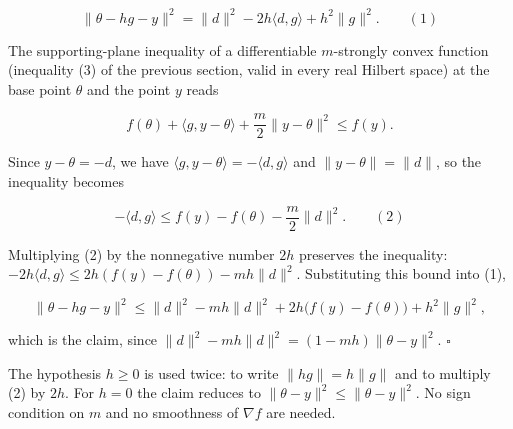 \documentclass[11pt,a4paper]{report}
\begin{document}
\[\|\theta-hg-y\|^2=\|d\|^2-2h\langle d,g\rangle+h^2\|g\|^2.\qquad(1)\]


The supporting-plane inequality of a differentiable \(m\)-strongly convex function (inequality (3) of the previous section, valid in every real Hilbert space) at the base point \(\theta\) and the point \(y\) reads


\[f(\theta)+\langle g,y-\theta\rangle+\frac m2\|y-\theta\|^2\le f(y).\]


Since \(y-\theta=-d\), we have \(\langle g,y-\theta\rangle=-\langle d,g\rangle\) and \(\|y-\theta\|=\|d\|\), so the inequality becomes


\[-\langle d,g\rangle\le f(y)-f(\theta)-\frac m2\|d\|^2.\qquad(2)\]


Multiplying (2) by the nonnegative number \(2h\) preserves the inequality: \(-2h\langle d,g\rangle\le2h(f(y)-f(\theta))-mh\|d\|^2\). Substituting this bound into (1),


\[\|\theta-hg-y\|^2\le\|d\|^2-mh\|d\|^2+2h\bigl(f(y)-f(\theta)\bigr)+h^2\|g\|^2,\]


which is the claim, since \(\|d\|^2-mh\|d\|^2=(1-mh)\|\theta-y\|^2\). \(\square\)




The hypothesis \(h\ge0\) is used twice: to write \(\|hg\|=h\|g\|\) and to multiply (2) by \(2h\). For \(h=0\) the claim reduces to \(\|\theta-y\|^2\le\|\theta-y\|^2\). No sign condition on \(m\) and no smoothness of \(\nabla f\) are needed.
\end{document}
